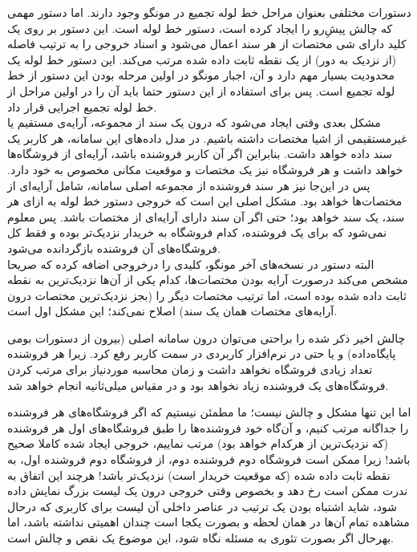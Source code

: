 دستورات مختلفی بعنوان مراحل خط لوله تجمیع در مونگو وجود دارند. اما دستور مهمی که چالش پیشِ‌رو را ایجاد کرده است،‌ دستور خط لوله  است. این دستور بر روی یک کلید دارای شی مختصات از هر سند اعمال می‌شود و اسناد خروجی را به ترتیب فاصله (از نزدیک به دور) از یک نقطه ثابت داده شده مرتب می‌کند. این دستور خط لوله یک محدودیت بسیار مهم دارد و آن، اجبار مونگو در اولین مرحله بودن این دستور از خط لوله تجمیع است. پس برای استفاده از این دستور حتما باید آن را در اولین مراحل از خط لوله تجمیع اجرایی قرار داد\cite{mongo:geo}.\\

مشکل بعدی وقتی ایجاد می‌شود که درون یک سند از مجموعه، آرایه‌ی مستقیم یا غیرمستقیمی از اشیا مختصات داشته باشیم. در مدل داده‌های این سامانه، هر کاربر یک سند داده خواهد داشت. بنابراین اگر آن کاربر فروشنده باشد، آرایه‌ای از فروشگاه‌ها خواهد داشت و هر فروشگاه نیز یک مختصات و موقعیت مکانی مخصوص به خود دارد. پس در این‌جا نیز هر سند فروشنده از مجموعه اصلی سامانه، شامل آرایه‌ای از مختصات‌ها خواهد بود. مشکل اصلی این است که خروجی دستور خط لوله  به ازای هر سند، یک سند خواهد بود؛ حتی اگر آن سند دارای آرایه‌ای از مختصات باشد. پس معلوم نمی‌شود که برای یک فروشنده، کدام فروشگاه به خریدار نزدیک‌تر بوده و فقط کل فروشگاه‌های آن فروشنده بازگردانده می‌شود.\\

البته دستور  در نسخه‌های آخر مونگو، کلیدی را درخروجی اضافه کرده که صریحا مشخص می‌کند درصورت آرایه بودن مختصات‌ها، کدام یکی از آن‌ها نزدیک‌ترین به نقطه ثابت داده شده بوده است، اما ترتیب مختصات دیگر را (بجز نزدیک‌ترین مختصات درون آرایه‌های مختصات همان یک سند) اصلاح نمی‌کند\cite{mongo:geo}؛ این مشکل اول است.

چالش اخیر ذکر شده را براحتی می‌توان درون سامانه اصلی (بیرون از دستورات بومی پایگاه‌داده) و یا حتی در نرم‌افزار کاربردی در سمت کاربر رفع کرد. زیرا هر فروشنده تعداد زیادی فروشگاه نخواهد داشت و زمان محاسبه موردنیاز برای مرتب کردن فروشگاه‌های یک فروشنده زیاد نخواهد بود و در مقیاس میلی‌ثانیه انجام خواهد شد.

\newpage

اما این تنها مشکل و چالش نیست؛ ما مطمئن نیستیم که اگر فروشگاه‌های هر فروشنده را جداگانه مرتب کنیم، و آن‌گاه خود فروشنده‌ها را طبق فروشگاه‌های اول هر فروشنده (که نزدیک‌ترین از هرکدام خواهد بود) مرتب نماییم، خروجی ایجاد شده کاملا صحیح باشد! زیرا ممکن است فروشگاه دوم  فروشنده دوم، از فروشگاه دوم فروشنده اول،‌ به نقطه ثابت داده شده (که موقعیت خریدار است) نزدیک‌تر باشد! هرچند این اتفاق به ندرت ممکن است رخ دهد و بخصوص وقتی خروجی درون یک لیست بزرگ نمایش داده شود، شاید اشتباه بودن یک ترتیب در عناصر داخلی آن لیست برای کاربری که درحال مشاهده تمام آن‌ها در همان لحظه و بصورت یکجا است چندان اهمیتی نداشته باشد، اما بهرحال اگر بصورت تئوری به مسئله نگاه شود، این موضوع یک نقص و چالش است.

